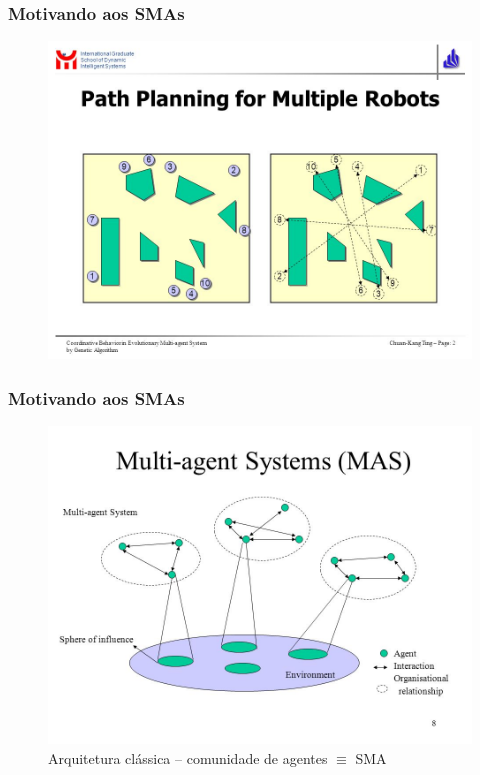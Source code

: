 \documentclass[10pt]{beamer}
\begin{document}
\begin{frame}
\frametitle{Motivando aos SMAs}

\begin{figure}[!ht]
\centering
\includegraphics[height =.6\textheight,width=.7\textwidth]{figuras/agentes_vizinhos02.jpeg}
\end{figure}
\end{frame}

\begin{frame}

  \frametitle{Motivando aos SMAs}

\begin{figure}[!ht]
\centering
\includegraphics[height =.6\textheight,width=.7\textwidth]{figuras/agentes_vizinhos03.jpeg}
\caption{Arquitetura clássica -- comunidade de agentes $\equiv $   SMA}
\end{figure}
 
\end{frame}
\end{document}
